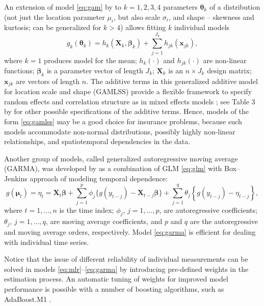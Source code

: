 \documentclass[
]{book}
\begin{document}
An extension of model \eqref{eq:gam} by \citet{Stasinopoulos:Rigby:2007} to \(k=1,2,3,4\) parameters \(\boldsymbol{\theta}_k\) of a distribution (not just the location parameter \(\mu_i\), but also scale \(\sigma_i\), and shape -- skewness and kurtosis; can be generalized for \(k>4\)) allows fitting \(k\) individual models
\begin{equation}
   \label{eq:gamlss}
    g_k(\boldsymbol{\theta}_k) = h_k\left(\mathbf{X}_k,\boldsymbol{\beta}_k\right) + \sum_{j=1}^{J_k}h_{jk}(\mathbf{x}_{jk}),
\end{equation}
where \(k=1\) produces model for the mean; \(h_k(\cdot)\) and \(h_{jk}(\cdot)\) are non-linear functions; \(\boldsymbol{\beta}_k\) is a parameter vector of length \(J_k\); \(\mathbf{X}_k\) is an \(n\times J_k\) design matrix; \(\mathbf{x}_{jk}\) are vectors of length \(n\). The additive terms in this generalized additive model for location scale and shape (GAMLSS) provide a flexible framework to specify random effects and correlation structure as in mixed effects models \citep{Zuur:etal:2009}; see Table 3 by \citet{Stasinopoulos:Rigby:2007} for other possible specifications of the additive terms. Hence, models of the form \eqref{eq:gamlss} may be a good choice for insurance problems, because such models accommodate non-normal distributions, possibly highly non-linear relationships, and spatiotemporal dependencies in the data.

Another group of models, called generalized autoregressive moving average (GARMA), was developed by \citet{Benjamin:etal:2003} as a combination of GLM \eqref{eq:glm} with Box--Jenkins approach of modeling temporal dependence:
\begin{equation}
    \label{eq:garma}
    g(\boldsymbol{\mu}_t) = \eta_t = \mathbf{X}_t\boldsymbol{\beta} + \sum_{j=1}^p{\phi_j \{ g(y_{t-j}) - \mathbf{X}_{t-j}\boldsymbol{\beta}\}} + \sum_{j=1}^q \theta_j \left\{ g(y_{t-j}) - \eta_{t-j}\right\},
\end{equation}
where \(t=1,\ldots,n\) is the time index; \(\phi_j\), \(j=1,\ldots,p\), are autoregressive coefficients; \(\theta_j\), \(j=1,\ldots,q\), are moving average coefficients, and \(p\) and \(q\) are the autoregressive and moving average orders, respectively. Model \eqref{eq:garma} is efficient for dealing with individual time series.

Notice that the issue of different reliability of individual measurements can be solved in models \eqref{eq:mlr}--\eqref{eq:garma} by introducing pre-defined weights in the estimation process. An automatic tuning of weights for improved model performance is possible with a number of boosting algorithms, such as AdaBoost.M1 \citep{Hastie:etal:2009}.
\end{document}
